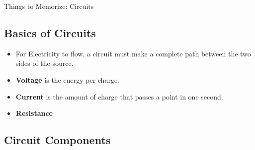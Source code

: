 \documentclass[letterpaper, 12pt]{article}
\begin{document}
	


\begin{center}Things to Memorize: Circuits
\end{center}

\subsection*{Basics of Circuits}
\begin{itemize}
	\item For Electricity to flow, a circuit must make a complete path between the two sides of the source. 
	\item \textbf{Voltage} is the energy per charge.
	\item \textbf{Current} is the amount of charge that passes a point in one second. 
	\item \textbf{Resistance} 
\end{itemize}
\subsection*{Circuit Components}
	
 
\end{document}
